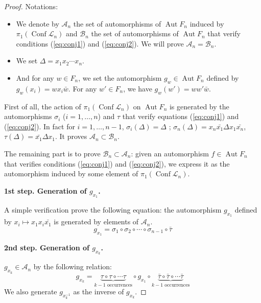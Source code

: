 \documentclass[11pt]{amsart}
\begin{document}
\begin{proof}
Notations:
\begin{itemize}
  \item We denote by $\mathcal{A}_n$ the set of automorphisms of ${\mathop{\mathrm{Aut}}\nolimits} F_n$ induced
by $\pi_1({\mathop{\mathrm{Conf}}\nolimits} \mathcal{L}_n)$ and $\mathcal{B}_n$ the set of automorphisms of ${\mathop{\mathrm{Aut}}\nolimits} F_n$
that verify conditions (\ref{eq:conj1}) and (\ref{eq:conj2}).
We will prove $\mathcal{A}_n=\mathcal{B}_n$.

  \item We set $\Delta = x_1x_2\cdots x_n$.

  \item And for any $w\in F_n$, we set the automorphism
$g_w \in {\mathop{\mathrm{Aut}}\nolimits} F_n$ defined by $g_w(x_i) = w x_i {\bar{{w}}}$.
For any $w'\in F_n$, we have $g_w(w')= w w' {\bar{{w}}}$.
\end{itemize}

 
\bigskip

First of all, the action of $\pi_1({\mathop{\mathrm{Conf}}\nolimits} \mathcal{L}_n)$ on ${\mathop{\mathrm{Aut}}\nolimits} F_n$
is generated by the automorphisms $\sigma_i$ ($i=1,\ldots,n$) and $\tau$
that verify equations (\ref{eq:conj1}) and (\ref{eq:conj2}). 
In fact for $i=1,\ldots,n-1$, $\sigma_i(\Delta)=\Delta$ ; 
$\sigma_n(\Delta) =x_n {\bar{{x_1}}} \Delta x_1 {\bar{{x_n}}}$, $\tau(\Delta)={\bar{{x_1}}} \Delta x_1$.
It proves $\mathcal{A}_n \subset \mathcal{B}_n$.

\bigskip

The remaining part is to prove $\mathcal{B}_n \subset \mathcal{A}_n$: given an automorphism $f \in {\mathop{\mathrm{Aut}}\nolimits} F_n$ that verifies
conditions (\ref{eq:conj1}) and (\ref{eq:conj2}), we express it as the automorphism induced by
some element of $\pi_1({\mathop{\mathrm{Conf}}\nolimits} \mathcal{L}_n)$. 
 
\bigskip

\textbf{1st step. Generation of $g_{x_1}$.}

A simple verification prove the following equation: the automorphism $g_{x_1}$ 
defined by $x_i \mapsto x_1 x_i {\bar{{x_1}}}$ is generated by
elements of $\mathcal{A}_n$.
$$g_{x_1} = \sigma_1 \circ \sigma_2 \circ \cdots \circ \sigma_{n-1} \circ {\bar{{\tau}}}$$

\bigskip

\textbf{2nd step. Generation of $g_{x_k}$.}

$g_{x_k} \in \mathcal{A}_n$ by the following relation:
$$g_{x_k} = \underbrace{\tau\circ \tau \circ \cdots \tau}_{k-1 \text{ occurrences}} \circ g_{x_1} \circ 
\underbrace{{\bar{{\tau}}}\circ{\bar{{\tau}}} \circ \cdots {\bar{{\tau}}}}_{k-1 \text{ occurrences}}$$
We also generate $g_{x_k^{-1}}$ as the inverse of $g_{x_k}$.


\end{proof}
\end{document}
